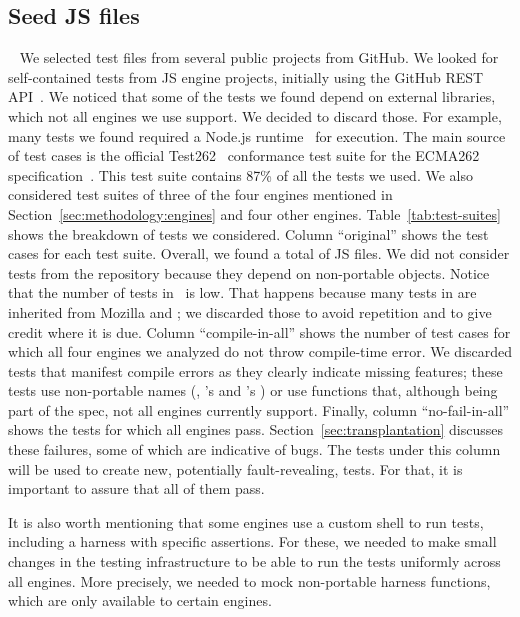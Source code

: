 \documentclass[10pt,conference,anonymous]{IEEEtran}
\begin{document}
\subsection{Seed JS files\label{sec:seeds}}~
We selected test files from several public projects from GitHub. We
looked for self-contained tests from JS engine projects, initially
using the GitHub REST API~\cite{github-rest-api}. We noticed that some
of the tests we found depend on external libraries, which not all
engines we use support. We decided to discard those. For example, many
tests we found required a Node.js runtime~\cite{node} for
execution. The main source of test cases is the official
Test262~\cite{tc39-github} conformance test suite for the ECMA262
specification~\cite{ecmas262-spec}. This test suite contains 87\% of
all the tests we used. We also considered test suites of three of the
four engines mentioned in Section~\ref{sec:methodology:engines} and
four other engines. Table~\ref{tab:test-suites} shows the breakdown of
tests we considered. Column ``original'' shows the test cases for each
test suite. Overall, we found a total of \totfiles{} JS files. We did
not consider tests from the \chakra{} repository because they depend
on non-portable objects. Notice that the number of tests in
\veight\ is low. That happens because many tests in \veight{} are
inherited from Mozilla and \jsc{}; we discarded those to avoid
repetition and to give credit where it is due. Column
``compile-in-all'' shows the number of test cases for which all four
engines we analyzed do not throw compile-time error. We discarded
tests that manifest compile errors as they clearly indicate missing
features; these tests use non-portable names (\eg{}, \jsc{}'s
 and \smonkey{}'s )
or use functions that, although being part of the spec, not all
engines currently support. Finally, column ``no-fail-in-all'' shows
the tests for which all engines
pass. Section~\ref{sec:transplantation} discusses these failures, some
of which are indicative of bugs. The tests under this column will be
used to create new, potentially fault-revealing, tests. For that, it
is important to assure that all of them pass.

It is also worth mentioning that some engines use a custom shell to
run tests, including a harness with specific assertions.  For these,
we needed to make small changes in the testing infrastructure to be
able to run the tests uniformly across all engines. More precisely, we
needed to mock non-portable harness functions, which are only
available to certain engines.
\end{document}
